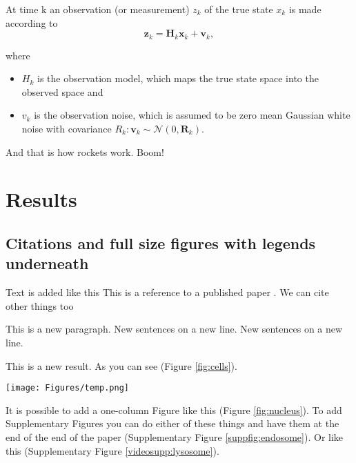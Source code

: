 At time k an observation (or measurement) $z_k$ of the true state $x_k$ is made according to
\begin{equation}
    {\displaystyle \mathbf {z} _{k}=\mathbf {H} _{k}\mathbf {x} _{k}+\mathbf {v} _{k}},
\end{equation}

where
\begin{itemize}
    \item $H_k$ is the observation model, which maps the true state space into the observed space and
    \item $v_k$ is the observation noise, which is assumed to be zero mean Gaussian white noise with covariance ${\displaystyle R_k:  \mathbf {v} _{k}\sim {\mathcal {N}}\left(0,\mathbf {R} _{k}\right)}$.
\end{itemize}
% 
% 
And that is how rockets work. Boom! \lipsum[6-10]

\section*{Results}\label{s:results}

\subsection*{Citations and full size figures with legends underneath}

Text is added like this
This is a reference to a published paper \citep{watson_molecular_1953}.
We can cite other things too \citep{tipton_complexities_2019,zheng_genome_2011,alberts_molecular_2002}

This is a new paragraph.
New sentences on a new line.
New sentences on a new line.

This is a new result.
As you can see (Figure \ref{fig:cells}).

\begin{figure*}
\centering
\texttt{[image: Figures/temp.png]}
\caption{\textbf{These are cells.}\\
(\textbf{A}) This is a regular figure with a legend as a caption underneath. Inset: 3X zoom. Scale bar, \SI{10}{\micro\meter}.}
\label{fig:cells}
\end{figure*}

It is possible to add a one-column Figure like this (Figure \ref{fig:nucleus}).
To add Supplementary Figures you can do either of these things and have them at the end of the end of the paper (Supplementary Figure \ref{suppfig:endosome}).
Or like this (Supplementary Figure \ref{videosupp:lysosome}).

